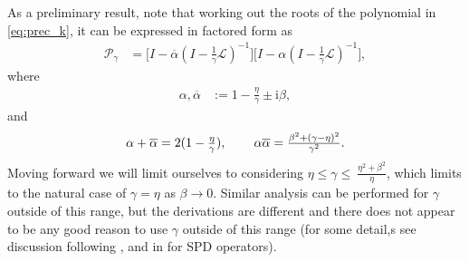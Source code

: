 \documentclass[review]{siamart}
\begin{document}
As a preliminary result, note that working out the roots of the polynomial
in \eqref{eq:prec_k}, it can be expressed in factored form as
%
\begin{align*}
\mathcal{P}_\gamma
	& = \Big[I - \overline{\alpha}\left(I - \tfrac{1}{\gamma}\mathcal{L}\right)^{-1}\Big]
	\Big[I - \alpha\left(I - \tfrac{1}{\gamma}\mathcal{L}\right)^{-1}\Big],
\end{align*}
%
where
%
\begin{align}\label{eq:alpha}
\alpha, \overline{\alpha} & := 1 - \frac{\eta}{\gamma} \pm \mathrm{i}\beta,
\end{align}
%
and
%
\begin{align}\label{eq:alpha_eq}
\alpha + \overline{\alpha} = 2(1 - \tfrac{\eta}{\gamma}), \hspace{5ex}
\alpha\overline{\alpha} = \tfrac{\beta^2 + (\gamma-\eta)^2}{\gamma^2}.
\end{align}
%
Moving forward we will limit ourselves to considering $\eta \leq \gamma \leq \
\tfrac{\eta^2+\beta^2}{\eta}$, which limits to the natural case of $\gamma = \eta$
as $\beta \to 0$. Similar analysis can be performed for $\gamma$ outside of
this range, but the derivations are different and there does not appear to
be any good reason to use $\gamma$ outside of this range (for some detail,s
see discussion following \Cref{th:cond}, and in \cite{exh} for SPD operators).
\end{document}
